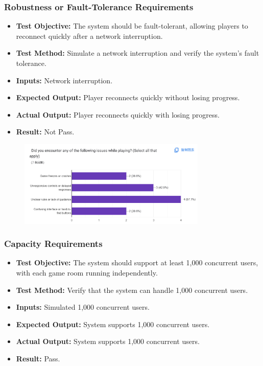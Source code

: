\documentclass[12pt, titlepage]{article}
\begin{document}
\subsubsection{Robustness or Fault-Tolerance Requirements}
\begin{itemize}
    \item \textbf{Test Objective:} The system should be fault-tolerant, allowing players to reconnect quickly after a network interruption.
    \item \textbf{Test Method:} Simulate a network interruption and verify the system's fault tolerance.
    \item \textbf{Inputs:} Network interruption.
    \item \textbf{Expected Output:} Player reconnects quickly without losing progress.
    \item \textbf{Actual Output:} Player reconnects quickly with losing progress.
    \item \textbf{Result:} Not Pass.
\end{itemize}
\begin{figure}[h!]
    \centering
    \includegraphics[width=0.8\textwidth]{image5.png}
    \caption{}
    \label{fig:labelname}
\end{figure}

\subsubsection{Capacity Requirements}
\begin{itemize}
    \item \textbf{Test Objective:} The system should support at least 1,000 concurrent users, with each game room running independently.
    \item \textbf{Test Method:} Verify that the system can handle 1,000 concurrent users.
    \item \textbf{Inputs:} Simulated 1,000 concurrent users.
    \item \textbf{Expected Output:} System supports 1,000 concurrent users.
    \item \textbf{Actual Output:} System supports 1,000 concurrent users.
    \item \textbf{Result:} Pass.
\end{itemize}
\end{document}
